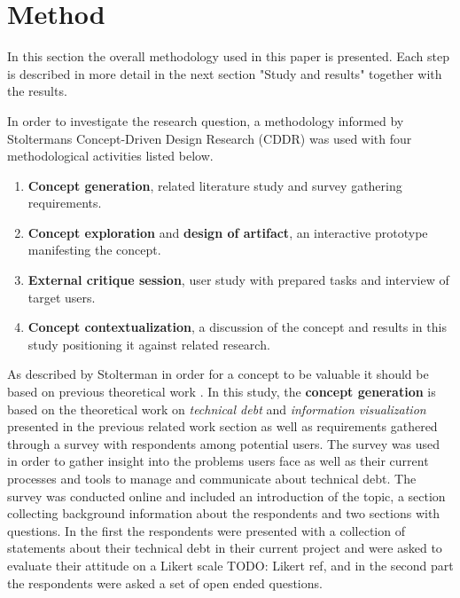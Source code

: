 

\section{Method}
In this section the overall methodology used in this paper is presented. Each step is described in more detail in the next section "Study and results" together with the results.

In order to investigate the research question, a methodology informed by Stoltermans Concept-Driven Design Research (CDDR) \cite{stolterman_concept-driven_2010} was used with four methodological activities listed below.

\smallskip
\begin{enumerate}
  \item \textbf{Concept generation}, related literature study and survey gathering requirements.
  \item \textbf{Concept exploration}  and \textbf{design of artifact}, an interactive prototype manifesting the concept.
  \item \textbf{External critique session}, user study with prepared tasks and interview of target users.
  \item \textbf{Concept contextualization}, a discussion of the concept and results in this study positioning it against related research.
\end{enumerate}
\smallskip

As described by Stolterman in order for a concept to be valuable it should be based on previous theoretical work \cite{stolterman_concept-driven_2010}.
In this study, the \textbf{concept generation} is based on the theoretical work on \textit{technical debt} and \textit{information visualization} presented in the previous related work section as well as requirements gathered through a survey with respondents among potential users.
The survey was used in order to gather insight into the problems users face as well as their current processes and tools to manage and communicate about technical debt. 
The survey was conducted online and included an introduction of the topic, a section collecting background information about the respondents and two sections with questions.
In the first the respondents were presented with a collection of statements about their technical debt in their current project and were asked to evaluate their attitude on a Likert scale TODO: Likert ref, and in the second part the respondents were asked a set of open ended questions.

